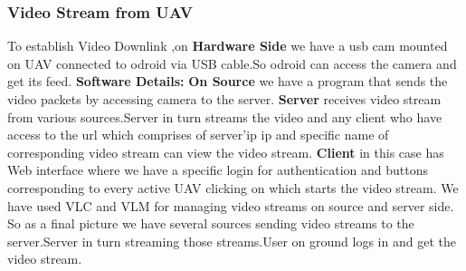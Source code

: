 \documentclass[12pt]{article}
\begin{document}
\subsubsection{Video Stream from UAV}
To establish Video Downlink ,on {\bf Hardware Side} we have a usb cam mounted on UAV connected to odroid via USB cable.So odroid can access the camera and get its feed.
\newline\newline
{\bf Software Details:}
\newline\newline
{\bf On Source} we have a program that sends the video packets by accessing camera to the server.\newline\newline
{\bf Server} receives video stream from various sources.Server in turn streams the video and any client who have access to the url which comprises of server'ip ip and specific name of corresponding video stream can view the video stream.\newline\newline
{\bf Client} in this case has Web interface where we have a specific login for authentication and buttons corresponding to every active UAV clicking on which starts the video stream.\newline\newline
We have used VLC and VLM for managing video streams on source and server side.
So as a final picture we have several sources sending video streams to the server.Server in turn streaming those streams.User on ground logs in and get the video stream.
\end{document}
